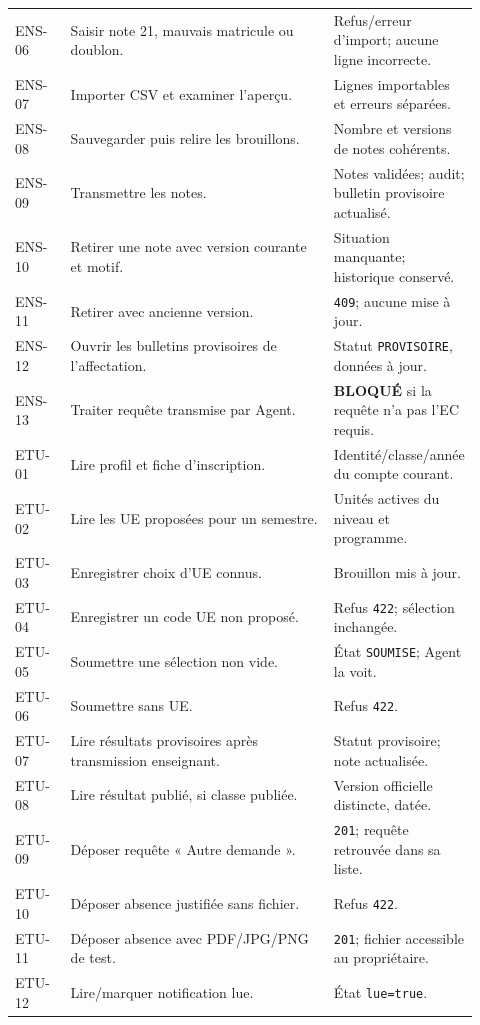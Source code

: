 \documentclass[10pt,a4paper]{article}
\begin{document}
\begin{longtable}{p{0.12\linewidth}p{0.58\linewidth}p{0.22\linewidth}}
ENS-06 & Saisir note 21, mauvais matricule ou doublon. & Refus/erreur d’import; aucune ligne incorrecte. \\
ENS-07 & Importer CSV et examiner l’aperçu. & Lignes importables et erreurs séparées. \\
ENS-08 & Sauvegarder puis relire les brouillons. & Nombre et versions de notes cohérents. \\
ENS-09 & Transmettre les notes. & Notes validées; audit; bulletin provisoire actualisé. \\
ENS-10 & Retirer une note avec version courante et motif. & Situation manquante; historique conservé. \\
ENS-11 & Retirer avec ancienne version. & \texttt{409}; aucune mise à jour. \\
ENS-12 & Ouvrir les bulletins provisoires de l’affectation. & Statut \texttt{PROVISOIRE}, données à jour. \\
ENS-13 & Traiter requête transmise par Agent. & \textbf{BLOQUÉ} si la requête n’a pas l’EC requis. \\
ETU-01 & Lire profil et fiche d’inscription. & Identité/classe/année du compte courant. \\
ETU-02 & Lire les UE proposées pour un semestre. & Unités actives du niveau et programme. \\
ETU-03 & Enregistrer choix d’UE connus. & Brouillon mis à jour. \\
ETU-04 & Enregistrer un code UE non proposé. & Refus \texttt{422}; sélection inchangée. \\
ETU-05 & Soumettre une sélection non vide. & État \texttt{SOUMISE}; Agent la voit. \\
ETU-06 & Soumettre sans UE. & Refus \texttt{422}. \\
ETU-07 & Lire résultats provisoires après transmission enseignant. & Statut provisoire; note actualisée. \\
ETU-08 & Lire résultat publié, si classe publiée. & Version officielle distincte, datée. \\
ETU-09 & Déposer requête « Autre demande ». & \texttt{201}; requête retrouvée dans sa liste. \\
ETU-10 & Déposer absence justifiée sans fichier. & Refus \texttt{422}. \\
ETU-11 & Déposer absence avec PDF/JPG/PNG de test. & \texttt{201}; fichier accessible au propriétaire. \\
ETU-12 & Lire/marquer notification lue. & État \texttt{lue=true}. \\

\end{longtable}
\end{document}
